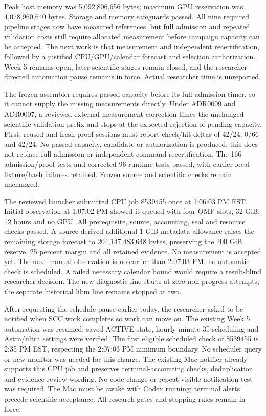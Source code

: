 Peak host memory was 5,092,806,656 bytes; maximum GPU reservation was
4,078,960,640 bytes. Storage and memory safeguards passed. All nine required
pipeline stages now have measured references, but full admission and repeated
validation costs still require allocated measurement before campaign capacity
can be accepted. The next work is that measurement and independent
recertification, followed by a justified CPU/GPU/calendar forecast and selection
authorization. Week 5 remains open, later scientific stages remain closed,
and the researcher-directed automation pause remains in force. Actual researcher
time is unreported.

The frozen assembler requires passed capacity before its full-admission timer,
so it cannot supply the missing measurements directly. Under ADR0009 and ADR0007,
a reviewed external measurement correction times the unchanged scientific
validation prefix and stops at the expected rejection of pending capacity.
First, reused and fresh proof sessions must report check/hit deltas of
42/24, 0/66 and 42/24. No passed capacity, candidate or authorization is produced;
this does not replace full admission or independent command recertification.
The 166 admission/proof tests and corrected 96 runtime tests passed, with earlier
local fixture/hash failures retained. Frozen source and scientific checks remain
unchanged.

The reviewed launcher submitted CPU job 8539455 once at 1:06:03 PM EST.
Initial observation at 1:07:02 PM showed it queued with four OMP slots, 32 GiB,
12 hours and no GPU. All prerequisite, source, accounting, seal and resource
checks passed. A source-derived additional 1 GiB metadata allowance raises the
remaining storage forecast to 204,147,483,648 bytes, preserving the 200 GiB reserve,
25 percent margin and all retained evidence. No measurement is accepted yet.
The next manual observation is no earlier than 2:07:03 PM; no automatic check
is scheduled. A failed necessary calendar bound would require a result-blind
researcher decision. The new diagnostic line starts at zero non-progress attempts;
the separate historical libm line remains stopped at two.


After requesting the schedule pause earlier today, the researcher asked to be
notified when SCC work completes so work can move on. The existing Week 5
automation was resumed; saved ACTIVE state, hourly minute-35 scheduling and
Astra/ultra settings were verified. The first eligible scheduled check of
8539455 is 2:35 PM EST, respecting the 2:07:03 PM minimum boundary. No scheduler
query or new monitor was needed for this change. The existing Mac notifier
already supports this CPU job and preserves terminal-accounting checks,
deduplication and evidence-review wording. No code change or repeat visible
notification test was required. The Mac must be awake with Codex running;
terminal alerts precede scientific acceptance. All research gates and stopping
rules remain in force.

